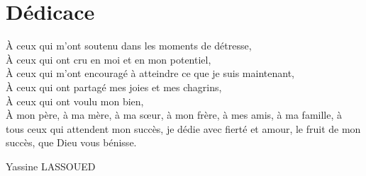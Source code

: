 \vspace{38mm}
\chapter*{\Huge \centering Dédicace}

\begingroup
À ceux qui m'ont soutenu dans les moments de détresse, \\
À ceux qui ont cru en moi et en mon potentiel, \\
À ceux qui m'ont encouragé à atteindre ce que je suis maintenant, \\
À ceux qui ont partagé mes joies et mes chagrins, \\
À ceux qui ont voulu mon bien, \\
À mon père, à ma mère, à ma sœur, à mon frère, à mes amis, à ma famille, à tous ceux qui attendent mon succès,
je dédie avec fierté et amour, le fruit de mon succès, que Dieu vous bénisse.
\endgroup


\vspace{8mm}
\begin{flushright}
    \LARGE Yassine LASSOUED
\end{flushright}

